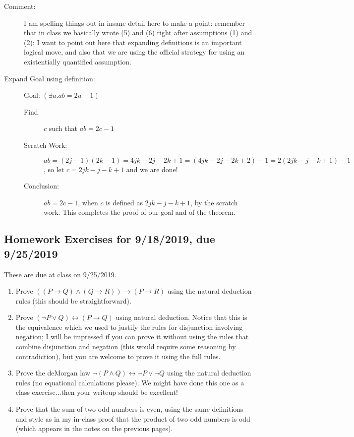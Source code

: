 \documentclass[12pt]{article}
\begin{document}
\begin{description}
\begin{description}
\item[Comment:] I am spelling things out in insane detail here to make
a point: remember that in class we basically wrote (5) and (6) right
after assumptions (1) and (2): I want to point out here that expanding
definitions is an important logical move, and also that we are using
the official strategy for using an existentially quantified
assumption.

\item [Expand Goal using definition:]  Goal: $(\exists u.ab=2u-1)$
\begin{description}
\item [Find] $c$ such that $ab=2c-1$

\item[Scratch Work:] $ab = (2j-1)(2k-1) = 4jk -2j-2k+1 = (4jk-2j-2k+2)-1 = 2(2jk - j -k+1)-1$, so let $c=2jk-j-k+1$ and we are done!

\item[Conclusion:]  $ab=2c-1$, when $c$ is defined as $2jk-j-k+1$, by the scratch work.  This completes the proof of our goal and of the theorem.
\end{description}


\end{description}



\end{description}


\subsection{Homework Exercises for 9/18/2019, due 9/25/2019}

These are due at class on 9/25/2019.

\begin{enumerate}

\item  Prove $((P \rightarrow Q) \wedge (Q \rightarrow R)) \rightarrow (P \rightarrow R)$ using the natural deduction rules (this should be straightforward).

\item Prove $(\neg P \vee Q) \leftrightarrow (P \rightarrow Q)$ using natural deduction.  Notice that this is the equivalence which we used to justify the rules for
disjunction involving negation; I will be impressed if you can prove it without using the rules that combine disjunction and negation (this would require some reasoning by contradiction), but you are welcome to prove it using the full rules.

\item  Prove the deMorgan law $\neg(P \wedge Q) \leftrightarrow \neg P \vee \neg Q$ using the natural deduction rules (no equational calculations please).  We might have done this one as a class exercise...then your writeup should be excellent!

\item  Prove that the sum of two odd numbers is even, using the same definitions and style as in my in-class proof that the product of two odd numbers is odd (which appears in the notes on the previous pages).


\end{enumerate}
\newpage
\end{document}

